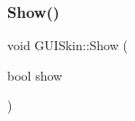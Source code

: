 \hypertarget{class_g_u_i_skin_a94b54b82c1587e9b63015e13b6c845ba}{}\label{class_g_u_i_skin_a94b54b82c1587e9b63015e13b6c845ba} 
\subsubsection{\texorpdfstring{Show()}{Show()}}
{\footnotesize\ttfamily void G\+U\+I\+Skin\+::\+Show (\begin{DoxyParamCaption}\item[{bool}]{show }\end{DoxyParamCaption})}

